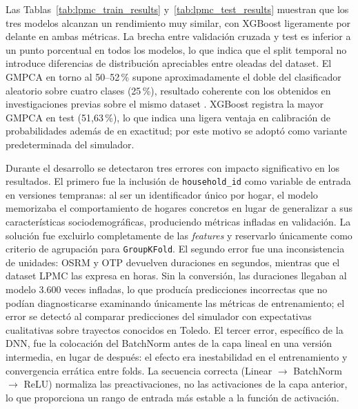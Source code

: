 Las Tablas~\ref{tab:lpmc_train_results} y~\ref{tab:lpmc_test_results} muestran que los tres modelos alcanzan un rendimiento muy similar, con XGBoost ligeramente por delante en ambas métricas. La brecha entre validación cruzada y test es inferior a un punto porcentual en todos los modelos, lo que indica que el split temporal no introduce diferencias de distribución apreciables entre oleadas del dataset. El GMPCA en torno al 50--52\,\% supone aproximadamente el doble del clasificador aleatorio sobre cuatro clases (25\,\%), resultado coherente con los obtenidos en investigaciones previas sobre el mismo dataset \cite{MartinBaos2023TRC}. XGBoost registra la mayor GMPCA en test (51,63\,\%), lo que indica una ligera ventaja en calibración de probabilidades además de en exactitud; por este motivo se adoptó como variante predeterminada del simulador.

Durante el desarrollo se detectaron tres errores con impacto significativo en los resultados. El primero fue la inclusión de \texttt{household\_id} como variable de entrada en versiones tempranas: al ser un identificador único por hogar, el modelo memorizaba el comportamiento de hogares concretos en lugar de generalizar a sus características sociodemográficas, produciendo métricas infladas en validación. La solución fue excluirlo completamente de las \textit{features} y reservarlo únicamente como criterio de agrupación para \texttt{GroupKFold}. El segundo error fue una inconsistencia de unidades: OSRM y OTP devuelven duraciones en segundos, mientras que el dataset LPMC las expresa en horas. Sin la conversión, las duraciones llegaban al modelo 3.600 veces infladas, lo que producía predicciones incorrectas que no podían diagnosticarse examinando únicamente las métricas de entrenamiento; el error se detectó al comparar predicciones del simulador con expectativas cualitativas sobre trayectos conocidos en Toledo. El tercer error, específico de la DNN, fue la colocación del BatchNorm antes de la capa lineal en una versión intermedia, en lugar de después: el efecto era inestabilidad en el entrenamiento y convergencia errática entre folds. La secuencia correcta (Linear $\to$ BatchNorm $\to$ ReLU) normaliza las preactivaciones, no las activaciones de la capa anterior, lo que proporciona un rango de entrada más estable a la función de activación.


